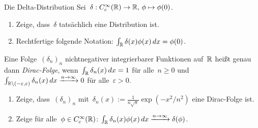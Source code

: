 \documentclass{pizzablatt}
\begin{document}
\begin{aufgabe}{Die Delta-Distribution}
Sei~$\delta : C^\infty_c(\mathbb{R}) \to \mathbb{R},\, \phi \mapsto \phi(0)$.
\begin{enumerate}
\item Zeige, dass~$\delta$ tatsächlich eine Distribution ist.
\item Rechtfertige folgende Notation: $\int_{\mathbb{R}} \delta(x) \phi(x) \,dx =
\phi(0)$.
\end{enumerate}
Eine Folge~$(\delta_n)_n$ nichtnegativer integrierbarer Funktionen
auf~$\mathbb{R}$ heißt genau dann \emph{Dirac-Folge}, wenn~$\int_{\mathbb{R}} \delta_n(x) \,dx
= 1$ für alle~$n \geq 0$ und~$\int_{\mathbb{R} \setminus (-\varepsilon,\varepsilon)}
\delta_n(x) \,dx \xrightarrow{n \to \infty} 0$ für alle~$\varepsilon > 0$.
\begin{enumerate}
\addtocounter{enumi}{2}
\item Zeige, dass~$(\delta_n)_n$ mit~$\delta_n(x) := \frac{1}{n \sqrt{\pi}}
\exp(-x^2 / n^2)$ eine Dirac-Folge ist.
\item Zeige für alle~$\phi \in C^\infty_c(\mathbb{R})$: $\int_{\mathbb{R}} \delta_n(x) \phi(x) \,dx
\xrightarrow{n \to \infty} \delta(\phi)$.
\end{enumerate}
\end{aufgabe}
\end{document}
